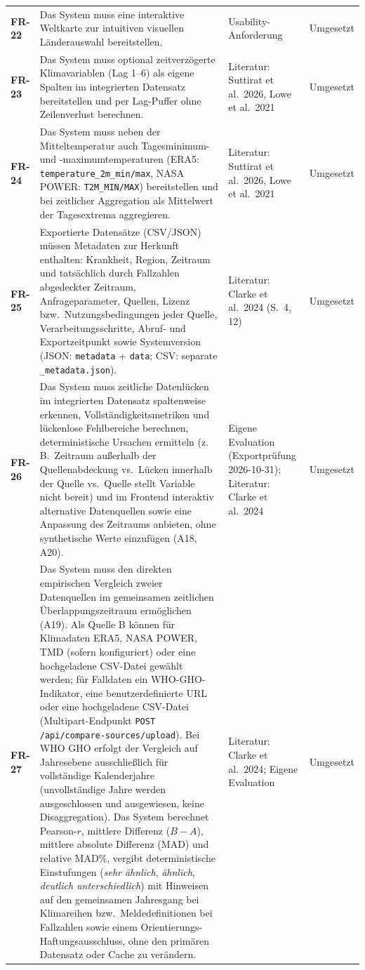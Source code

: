 \documentclass[11pt,a4paper]{article}
\begin{document}
\begin{longtable}{@{}>{\bfseries}p{1.6cm} L{7.4cm} L{3.6cm} L{2.4cm}@{}}
FR-22 & Das System muss eine interaktive Weltkarte zur intuitiven visuellen L\"anderauswahl bereitstellen. & Usability-Anforderung & Umgesetzt \\
FR-23 & Das System muss optional zeitverz\"ogerte Klimavariablen (Lag 1--6) als eigene Spalten im integrierten Datensatz bereitstellen und per Lag-Puffer ohne Zeilenverlust berechnen. & Literatur: Suttirat et al.\ 2026, Lowe et al.\ 2021 & Umgesetzt \\
FR-24 & Das System muss neben der Mitteltemperatur auch Tagesminimum- und -maximumtemperaturen (ERA5: \texttt{temperature\_2m\_min/max}, NASA POWER: \texttt{T2M\_MIN/MAX}) bereitstellen und bei zeitlicher Aggregation als Mittelwert der Tagesextrema aggregieren. & Literatur: Suttirat et al.\ 2026, Lowe et al.\ 2021 & Umgesetzt \\
FR-25 & Exportierte Datens\"atze (CSV/JSON) m\"ussen Metadaten zur Herkunft enthalten: Krankheit, Region, Zeitraum und tats\"achlich durch Fallzahlen abgedeckter Zeitraum, Anfrageparameter, Quellen, Lizenz bzw.\ Nutzungsbedingungen jeder Quelle, Verarbeitungsschritte, Abruf- und Exportzeitpunkt sowie Systemversion (JSON: \texttt{metadata} + \texttt{data}; CSV: separate \texttt{\_metadata.json}). & Literatur: Clarke et al.\ 2024 (S.~4, 12) & Umgesetzt \\
FR-26 & Das System muss zeitliche Datenl\"ucken im integrierten Datensatz spaltenweise erkennen, Vollst\"andigkeitsmetriken und l\"uckenlose Fehlbereiche berechnen, deterministische Ursachen ermitteln (z.\,B.\ Zeitraum au\ss{}erhalb der Quellenabdeckung vs.\ L\"ucken innerhalb der Quelle vs.\ Quelle stellt Variable nicht bereit) und im Frontend interaktiv alternative Datenquellen sowie eine Anpassung des Zeitraums anbieten, ohne synthetische Werte einzuf\"ugen (A18, A20). & Eigene Evaluation (Exportpr\"ufung 2026-10-31); Literatur: Clarke et al.\ 2024 & Umgesetzt \\
FR-27 & Das System muss den direkten empirischen Vergleich zweier Datenquellen im gemeinsamen zeitlichen \"Uberlappungszeitraum erm\"oglichen (A19). Als Quelle B k\"onnen f\"ur Klimadaten ERA5, NASA POWER, TMD (sofern konfiguriert) oder eine hochgeladene CSV-Datei gew\"ahlt werden; f\"ur Falldaten ein WHO-GHO-Indikator, eine benutzerdefinierte URL oder eine hochgeladene CSV-Datei (Multipart-Endpunkt \texttt{POST /api/compare-sources/upload}). Bei WHO GHO erfolgt der Vergleich auf Jahresebene ausschlie\ss{}lich f\"ur vollst\"andige Kalenderjahre (unvollst\"andige Jahre werden ausgeschlossen und ausgewiesen, keine Disaggregation). Das System berechnet Pearson-$r$, mittlere Differenz ($B - A$), mittlere absolute Differenz (MAD) und relative MAD\%, vergibt deterministische Einstufungen (\emph{sehr \"ahnlich}, \emph{\"ahnlich}, \emph{deutlich unterschiedlich}) mit Hinweisen auf den gemeinsamen Jahresgang bei Klimareihen bzw.\ Meldedefinitionen bei Fallzahlen sowie einem Orientierungs-Haftungsausschluss, ohne den prim\"aren Datensatz oder Cache zu ver\"andern. & Literatur: Clarke et al.\ 2024; Eigene Evaluation & Umgesetzt \\

\end{longtable}
\end{document}

